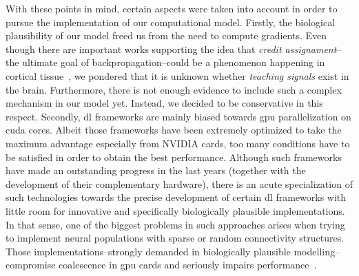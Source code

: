 \documentclass[10pt,journal,compsoc]{IEEEtran}
\newcommand{\CC}{C\nolinebreak\hspace{-.05em}\raisebox{.4ex}{\tiny\bf +}\nolinebreak\hspace{-.10em}\raisebox{.4ex}{\tiny\bf +}}
\begin{document}
With these points in mind, certain aspects were taken into account in order to pursue the implementation of our computational model. Firstly, the biological plausibility of our model freed us from the need to compute gradients. Even though there are important works supporting the idea that \emph{credit assignament}--the ultimate goal of backpropagation--could be a phenomenon happening in cortical tissue~\cite{Guerguiev2017TowardsDL}, we pondered that it is unknown whether \emph{teaching signals} exist in the brain. Furthermore, there is not enough evidence to include such a complex mechanism in our model yet. Instead, we decided to be conservative in this respect. Secondly, \gls{dl} frameworks are mainly biased towards \gls{gpu} parallelization on \gls{cuda} cores. Albeit those frameworks have been extremely optimized to take the maximum advantage especially from NVIDIA cards, too many conditions have to be satisfied in order to obtain the best performance. Although such frameworks have made an outstanding progress in the last years (together with the development of their complementary hardware), there is an acute specialization of such technologies towards the precise development of certain \gls{dl} frameworks with little room for innovative and specifically biologically plausible implementations. In that sense, one of the biggest problems in such approaches arises when trying to implement neural populations with sparse or random connectivity structures. Those implementations--strongly demanded in biologically plausible modelling--compromise coalescence in \gls{gpu} cards and seriously impairs performance~\cite{doi:10.3109/0954898X.2012.739292}.

\end{document}

